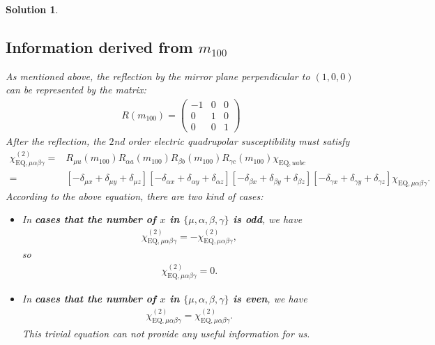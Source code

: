 \documentclass[UTF8,10pt,a4paper]{article}
\theoremstyle{Problem}
\theoremstyle{Solution}
\newtheorem*{sol}{Solution}
\begin{document}
\begin{sol}
    \subsection{Information derived from $m_{100}$}
    As mentioned above, the reflection by the mirror plane perpendicular to $(1,0,0)$ can be represented by the matrix:
    \begin{align}
        R(m_{100})=\left(\begin{matrix}
            -1&0&0\\
            0&1&0\\
            0&0&1
        \end{matrix}\right)
    \end{align}
    After the reflection, the $2$nd order electric quadrupolar susceptibility must satisfy
    \begin{align}
        \nonumber\chi_{\text{EQ},\mu\alpha\beta\gamma}^{(2)}=&R_{\mu u}(m_{100})R_{\alpha a}(m_{100})R_{\beta b}(m_{100})R_{\gamma c}(m_{100})\chi_{\text{EQ},uabc}\\
        =&[-\delta_{\mu x}+\delta_{\mu y}+\delta_{\mu z}][-\delta_{\alpha x}+\delta_{\alpha y}+\delta_{\alpha z}][-\delta_{\beta x}+\delta_{\beta y}+\delta_{\beta z}][-\delta_{\gamma x}+\delta_{\gamma y}+\delta_{\gamma z}]\chi_{\text{EQ},\mu\alpha\beta\gamma}.
    \end{align}
    According to the above equation, there are two kind of cases:
    \begin{itemize}
        \item In \textbf{cases that the number of $x$ in $\{\mu,\alpha,\beta,\gamma\}$ is odd}, we have
        \begin{align}
            \chi_{\text{EQ},\mu\alpha\beta\gamma}^{(2)}=-\chi_{\text{EQ},\mu\alpha\beta\gamma}^{(2)},
        \end{align}
        so
        \begin{align}
            \chi_{\text{EQ},\mu\alpha\beta\gamma}^{(2)}=0.
        \end{align}
        \item In \textbf{cases that the number of $x$ in $\{\mu,\alpha,\beta,\gamma\}$ is even}, we have
        \begin{align}
            \chi_{\text{EQ},\mu\alpha\beta\gamma}^{(2)}=\chi_{\text{EQ},\mu\alpha\beta\gamma}^{(2)}.
        \end{align}
        This trivial equation can not provide any useful information for us.
    \end{itemize}


\end{sol}
\end{document}

